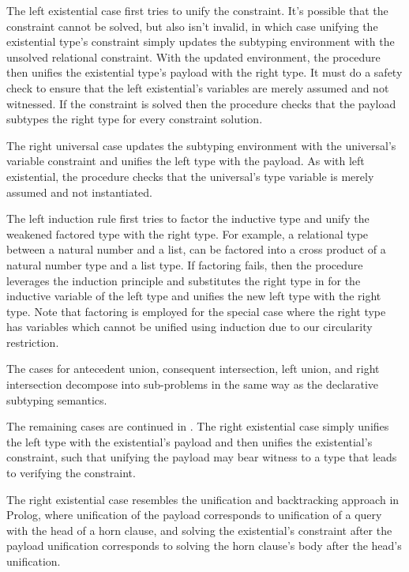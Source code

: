 \documentclass[acmsmall]{acmart}
\theoremstyle{definition}
\begin{document}
The left existential case first tries to unify the constraint. It's possible that the
constraint cannot be solved, but also isn't invalid, in which case unifying the existential type's constraint 
simply updates the subtyping environment with the unsolved relational constraint. 
With the updated environment, the procedure then unifies the existential type's payload with the right type.
It must do a safety check to ensure that 
the left existential's variables are merely assumed and not witnessed. 
If the constraint is solved then the procedure 
checks that the payload subtypes the right type for every constraint solution.

The right universal case updates the subtyping environment with the universal's variable constraint
and unifies the left type with the payload. As with left existential, the procedure checks that
the universal's type variable is merely assumed and not instantiated.

The left induction rule first tries to factor the inductive type and unify the weakened factored type
with the right type. For example, a relational type between a natural number and a list, can be factored into
a cross product of a natural number type and a list type. 
If factoring fails, then the procedure leverages the induction principle and substitutes the right type 
in for the inductive variable of the left type and unifies the new left type with the right type.    
Note that factoring is employed for the special
case where the right type has variables which cannot be unified 
using induction due to our circularity restriction.  

The cases for antecedent union, consequent intersection, left union, and right intersection
decompose into sub-problems in the same way as the declarative subtyping semantics.

The remaining cases are continued in .
The right existential case simply unifies the left type with the existential's payload
and then unifies the existential's constraint, such that unifying the payload
may bear witness to a type that leads to verifying the constraint. 


The right existential case resembles the unification and backtracking approach in Prolog, 
where unification of the payload corresponds to unification of a query with the head of a horn clause,
and solving the existential's constraint after the payload unification corresponds to
solving the horn clause's body after the head's unification.  
\end{document}

